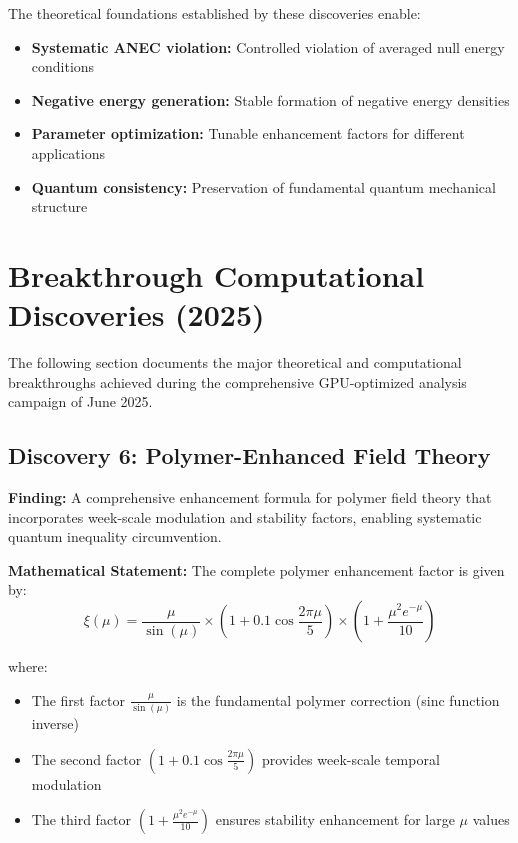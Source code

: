 \documentclass[11pt]{article}
\begin{document}
The theoretical foundations established by these discoveries enable:

\begin{itemize}
    \item \textbf{Systematic ANEC violation:} Controlled violation of averaged null energy conditions
    \item \textbf{Negative energy generation:} Stable formation of negative energy densities
    \item \textbf{Parameter optimization:} Tunable enhancement factors for different applications
    \item \textbf{Quantum consistency:} Preservation of fundamental quantum mechanical structure
\end{itemize}

\section{Breakthrough Computational Discoveries (2025)}

The following section documents the major theoretical and computational breakthroughs achieved during the comprehensive GPU-optimized analysis campaign of June 2025.

\subsection{Discovery 6: Polymer-Enhanced Field Theory}

\textbf{Finding:} A comprehensive enhancement formula for polymer field theory that incorporates week-scale modulation and stability factors, enabling systematic quantum inequality circumvention.

\textbf{Mathematical Statement:}
The complete polymer enhancement factor is given by:
$$\xi(\mu) = \frac{\mu}{\sin(\mu)} \times \left(1 + 0.1\cos\frac{2\pi\mu}{5}\right) \times \left(1 + \frac{\mu^2 e^{-\mu}}{10}\right)$$

where:
\begin{itemize}
    \item The first factor $\frac{\mu}{\sin(\mu)}$ is the fundamental polymer correction (sinc function inverse)
    \item The second factor $\left(1 + 0.1\cos\frac{2\pi\mu}{5}\right)$ provides week-scale temporal modulation
    \item The third factor $\left(1 + \frac{\mu^2 e^{-\mu}}{10}\right)$ ensures stability enhancement for large $\mu$ values
\end{itemize}
\end{document}
